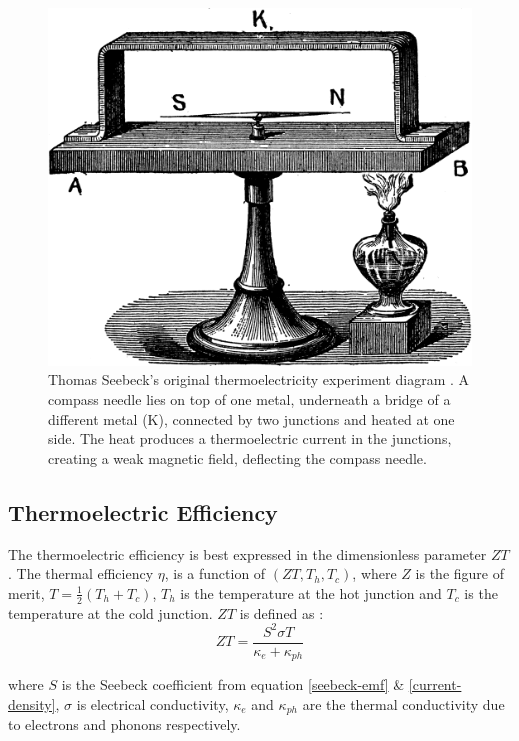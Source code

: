 \documentclass[12pt]{article}
\begin{document}
\begin{figure}
	\centering
	\includegraphics[width=\textwidth]{seebeck-experiment-black.png}
	\caption{Thomas Seebeck's original thermoelectricity experiment diagram \cite{seebeck-original}. A compass needle lies on top of one metal, underneath a bridge of a different metal (K), connected by two junctions and heated at one side. The heat produces a thermoelectric current in the junctions, creating a weak magnetic field, deflecting the compass needle.}
	\label{fig:seebeck-experiment}
\end{figure}

\subsection{Thermoelectric Efficiency}
\label{sec:efficiency}
The thermoelectric efficiency is best expressed in the dimensionless parameter $ZT$. The thermal efficiency $\eta$, is a function of $(ZT, T_h, T_c)$, where $Z$ is the figure of merit, $T = \frac{1}{2}(T_h + T_c)$, $T_h$ is the temperature at the hot junction and $T_c$ is the temperature at the cold junction. $ZT$ is defined as \cite{modern-thermoelectrics}:
\begin{equation}
\label{zt}
	ZT = \frac{S^2 \sigma T}{\kappa_e + \kappa_{ph}}
\end{equation}

where $S$ is the Seebeck coefficient from equation \eqref{seebeck-emf} \& \eqref{current-density}, $\sigma$ is electrical conductivity, $\kappa_e$ and $\kappa_{ph}$ are the thermal conductivity due to electrons and phonons respectively.
\end{document}
